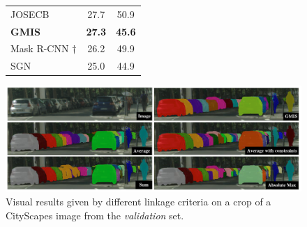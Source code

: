 \begin{figure}[t]
\begin{minipage}[t]{0.49\textwidth}
\begin{tabular}[t]{l|cc}
       JOSECB \cite{neven2019instance} & 27.7 & 50.9 \\
       \textbf{GMIS} \cite{liu2018affinity} & \textbf{27.3} & \textbf{45.6} \\
       Mask R-CNN \cite{he2017mask} $\dagger$ & 26.2 & 49.9 \\
       SGN \cite{liu2017sgn} & 25.0 & 44.9 \\
    \end{tabular}
\label{tab:results_cityscapes}
\label{tab:results_cityscapes_test}
\end{minipage}
\end{figure}
\begin{figure}[t]
\centering
\begin{minipage}{0.48\textwidth}
\centering
\includegraphics[width=\textwidth]{./figs/cityscapes_compare_6.pdf} %
\caption{Visual results given by different \algname{} linkage criteria on a crop of a CityScapes image from the \emph{validation} set.}\label{fig:cityscapes}
\end{minipage}
\end{figure}


